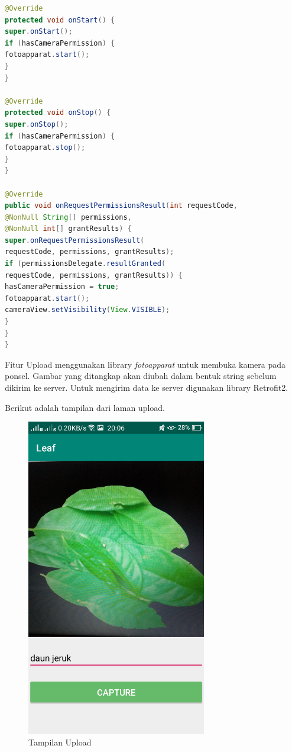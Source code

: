 \begin{lstlisting}[language=Java, caption=Implementasi Fitur Upload, label=code:upload, firstnumber=53, breaklines]
@Override
protected void onStart() {
super.onStart();
if (hasCameraPermission) {
fotoapparat.start();
}
}

@Override
protected void onStop() {
super.onStop();
if (hasCameraPermission) {
fotoapparat.stop();
}
}

@Override
public void onRequestPermissionsResult(int requestCode,
@NonNull String[] permissions,
@NonNull int[] grantResults) {
super.onRequestPermissionsResult(
requestCode, permissions, grantResults);
if (permissionsDelegate.resultGranted(
requestCode, permissions, grantResults)) {
hasCameraPermission = true;
fotoapparat.start();
cameraView.setVisibility(View.VISIBLE);
}
}
}
\end{lstlisting}

\par Fitur Upload menggunakan library \textit{fotoapparat} untuk membuka kamera pada ponsel. Gambar yang ditangkap akan diubah dalam bentuk string sebelum dikirim ke server. Untuk mengirim data ke server digunakan library Retrofit2.

\par Berikut adalah tampilan dari laman upload.
\begin{figure}[H]
	\centering\includegraphics[width=0.7\textwidth]{bab4/figures/upload.png}
	\caption{Tampilan Upload}
	\label{fig:upload}
\end{figure}
